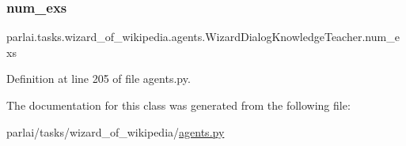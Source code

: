 \subsubsection{\texorpdfstring{num\+\_\+exs}{num\_exs}}
{\footnotesize\ttfamily parlai.\+tasks.\+wizard\+\_\+of\+\_\+wikipedia.\+agents.\+Wizard\+Dialog\+Knowledge\+Teacher.\+num\+\_\+exs}



Definition at line 205 of file agents.\+py.



The documentation for this class was generated from the following file\+:\begin{DoxyCompactItemize}
\item 
parlai/tasks/wizard\+\_\+of\+\_\+wikipedia/\hyperlink{parlai_2tasks_2wizard__of__wikipedia_2agents_8py}{agents.\+py}\end{DoxyCompactItemize}
